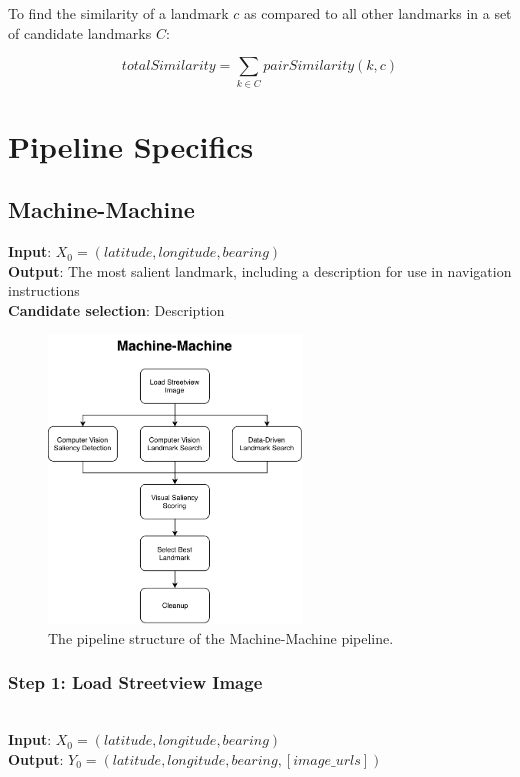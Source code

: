 To find the similarity of a landmark $c$ as compared to all other landmarks in a set of candidate landmarks $C$:

\begin{equation}\label{eq:landmrkSimilarityOverall}
    totalSimilarity = \sum\limits_{k \in C} pairSimilarity(k, c)
\end{equation}

\section{Pipeline Specifics}
\subsection{Machine-Machine}

\noindent \textbf{Input}: $X_0 = (latitude, longitude, bearing)$\\
\textbf{Output}: The most salient landmark, including a description for use in navigation instructions\\
\textbf{Candidate selection}: Description

\begin{figure}[htbp]
  \centering
  \includegraphics[width=0.6\textwidth]{pipeline_diagrams/machine-machine.pdf}
  \caption{The pipeline structure of the Machine-Machine pipeline.}
  \label{fig:pipeline:mm}
\end{figure}

\subsubsection*{Step 1: Load Streetview Image}~\\
\noindent \textbf{Input}: $X_0 = (latitude, longitude, bearing)$\\
\textbf{Output}: $Y_0 = (latitude, longitude, bearing, [image\_urls])$

